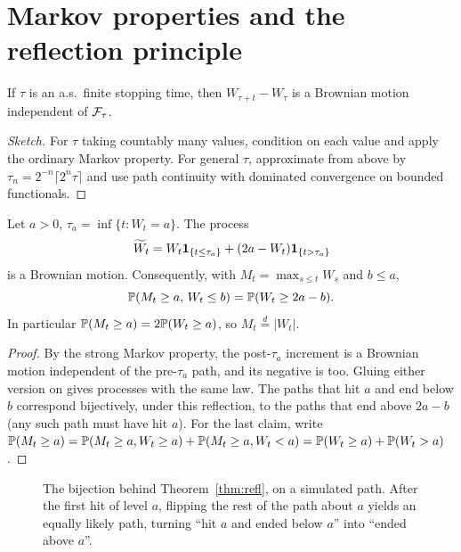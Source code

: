 \section{Markov properties and the reflection principle}

\begin{theorem}\label{thm:smp}
If $\tau$ is an a.s.\ finite stopping time, then $W_{\tau+t}-W_\tau$ is a Brownian motion independent of $\mathcal{F}_\tau$.
\end{theorem}
\begin{proof}[Sketch]
For $\tau$ taking countably many values, condition on each value and apply the ordinary Markov property. For general $\tau$, approximate from above by $\tau_n=2^{-n}\lceil2^n\tau\rceil$ and use path continuity with dominated convergence on bounded functionals.
\end{proof}

\begin{theorem}\label{thm:refl}
Let $a>0$, $\tau_a=\inf\{t:W_t=a\}$. The process
\[
\widetilde W_t=W_t\mathbf{1}_{\{t\le\tau_a\}}+(2a-W_t)\mathbf{1}_{\{t>\tau_a\}}
\]
is a Brownian motion. Consequently, with $M_t=\max_{s\le t}W_s$ and $b\le a$,
\[
\mathbb{P}(M_t\ge a,\,W_t\le b)=\mathbb{P}(W_t\ge2a-b).
\]
In particular $\mathbb{P}(M_t\ge a)=2\mathbb{P}(W_t\ge a)$, so $M_t\overset{d}{=}|W_t|$.
\end{theorem}
\begin{proof}
By the strong Markov property, the post-$\tau_a$ increment is a Brownian motion independent of the pre-$\tau_a$ path, and its negative is too. Gluing either version on gives processes with the same law. The paths that hit $a$ and end below $b$ correspond bijectively, under this reflection, to the paths that end above $2a-b$ (any such path must have hit $a$). For the last claim, write $\mathbb{P}(M_t\ge a)=\mathbb{P}(M_t\ge a,W_t\ge a)+\mathbb{P}(M_t\ge a,W_t<a)=\mathbb{P}(W_t\ge a)+\mathbb{P}(W_t>a)$.
\end{proof}

\begin{figure}[t]
\centering
{}
\caption{The bijection behind Theorem~\ref{thm:refl}, on a simulated path. After the first hit of level $a$, flipping the rest of the path about $a$ yields an equally likely path, turning ``hit $a$ and ended below $a$'' into ``ended above $a$''.}
\label{fig:reflect}
\end{figure}

